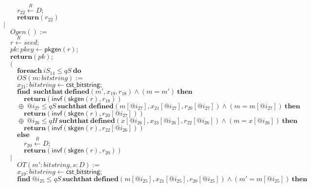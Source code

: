 \documentclass{article}
\newcommand{\store}{\leftarrow}
\newcommand{\getR}{\stackrel{R}{\store}}
\newcommand{\kw}[1]{\mathbf{#1}}
\newcommand{\kwf}[1]{\mathsf{#1}}
\newcommand{\var}[1]{\mathit{#1}}
\newcommand{\kwt}[1]{\mathit{#1}}
\newcommand{\kwp}[1]{\mathit{#1}}
\begin{document}
\begin{tabbing}
$\quad \quad \var{r}_{22} \getR \kwt{D};$\\
$\quad \quad \kw{return}\kwf{}(\var{r}_{22})$\\
$|$\\
$\quad Ogen() :=$\\
$\quad \var{r} \getR \kwt{seed};$\\
$\quad \var{pk}: \kwt{pkey} \store \kwf{pkgen}(\var{r});$\\
$\quad \kw{return}\kwf{}(\var{pk});$\\
$\quad ($\\
$\quad \quad \kw{foreach}\ \var{iS}_{14} \leq \kwp{qS}\ \kw{do}$\\
$\quad \quad OS(\var{m}: \kwt{bitstring}) :=$\\
$\quad \quad \var{x}_{21}: \kwt{bitstring} \store \kwf{cst\_bitstring};$\\
$\quad \quad \kw{find}\ \ \kw{suchthat}\ \kw{defined}(\var{m'}, \var{x}_{19}, \var{r}_{18})\wedge (\var{m}  =  \var{m'})\ \kw{then}$\\
$\quad \quad \quad \kw{return}\kwf{}(\kwf{invf}(\kwf{skgen}(\var{r}), \var{r}_{18}))$\\
$\quad \quad \oplus\ \var{@i}_{27} \leq \kwp{qS}\ \kw{suchthat}\ \kw{defined}(\var{m}[\var{@i}_{27}], \var{x}_{21}[\var{@i}_{27}], \var{r}_{20}[\var{@i}_{27}])\wedge (\var{m}  =  \var{m}[\var{@i}_{27}])\ \kw{then}$\\
$\quad \quad \quad \kw{return}\kwf{}(\kwf{invf}(\kwf{skgen}(\var{r}), \var{r}_{20}[\var{@i}_{27}]))$\\
$\quad \quad \oplus\ \var{@i}_{26} \leq \kwp{qH}\ \kw{suchthat}\ \kw{defined}(\var{x}[\var{@i}_{26}], \var{x}_{23}[\var{@i}_{26}], \var{r}_{22}[\var{@i}_{26}])\wedge (\var{m}  =  \var{x}[\var{@i}_{26}])\ \kw{then}$\\
$\quad \quad \quad \kw{return}\kwf{}(\kwf{invf}(\kwf{skgen}(\var{r}), \var{r}_{22}[\var{@i}_{26}]))$\\
$\quad \quad \kw{else}$\\
$\quad \quad \quad \var{r}_{20} \getR \kwt{D};$\\
$\quad \quad \quad \kw{return}\kwf{}(\kwf{invf}(\kwf{skgen}(\var{r}), \var{r}_{20}))$\\
$\quad |$\\
$\quad \quad OT(\var{m'}: \kwt{bitstring}, \var{s}: \kwt{D}) :=$\\
$\quad \quad \var{x}_{19}: \kwt{bitstring} \store \kwf{cst\_bitstring};$\\
$\quad \quad \kw{find}\ \var{@i}_{25} \leq \kwp{qS}\ \kw{suchthat}\ \kw{defined}(\var{m}[\var{@i}_{25}], \var{x}_{21}[\var{@i}_{25}], \var{r}_{20}[\var{@i}_{25}])\wedge (\var{m'}  =  \var{m}[\var{@i}_{25}])\ \kw{then}$\\

\end{tabbing}
\end{document}
